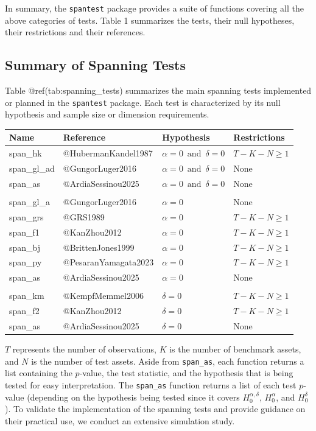In summary, the \texttt{spantest} package provides a suite of functions
covering all the above categories of tests. Table 1 summarizes the
tests, their null hypotheses, their restrictions and their references.

\subsection{Summary of Spanning Tests}\label{sec:spanning_tests}

Table @ref(tab:spanning\_tests) summarizes the main spanning tests
implemented or planned in the \texttt{spantest} package. Each test is
characterized by its null hypothesis and sample size or dimension
requirements.

\begin{tabular}{llll}
\toprule
Name & Reference & Hypothesis & Restrictions\\
\midrule
span\_hk & @HubermanKandel1987 & $\alpha = 0\,\text{ and }\, \delta = 0$ & $T - K - N \geq 1$\\
span\_gl\_ad & @GungorLuger2016 & $\alpha = 0\,\text{ and }\, \delta = 0$ & None\\
span\_as & @ArdiaSessinou2025 & $\alpha = 0\,\text{ and }\, \delta = 0$ & None\\
 &  &  & \\
span\_gl\_a & @GungorLuger2016 & $\alpha = 0$ & None\\
\addlinespace
span\_grs & @GRS1989 & $\alpha = 0$ & $T - K - N \geq 1$\\
span\_f1 & @KanZhou2012 & $\alpha = 0$ & $T - K - N \geq 1$\\
span\_bj & @BrittenJones1999 & $\alpha = 0$ & $T - K - N \geq 1$\\
span\_py & @PesaranYamagata2023 & $\alpha = 0$ & $T - K - N \geq 1$\\
span\_as & @ArdiaSessinou2025 & $\alpha = 0$ & None\\
\addlinespace
 &  &  & \\
span\_km & @KempfMemmel2006 & $\delta = 0$ & $T - K - N \geq 1$\\
span\_f2 & @KanZhou2012 & $\delta = 0$ & $T - K - N \geq 1$\\
span\_as & @ArdiaSessinou2025 & $\delta = 0$ & None\\
\bottomrule
\end{tabular}

\(T\) represents the number of observations, \(K\) is the number of
benchmark assets, and \(N\) is the number of test assets. Aside from
\texttt{span\_as}, each function returns a list containing the \(p\)-value, the
test statistic, and the hypothesis that is being tested for easy
interpretation. The \texttt{span\_as} function returns a list of each test
\(p\)-value (depending on the hypothesis being tested since it covers
\(H_0^{\alpha,\delta}\), \(H_0^{\alpha}\), and \(H_0^{\delta}\)). To validate
the implementation of the spanning tests and provide guidance on their
practical use, we conduct an extensive simulation study.

